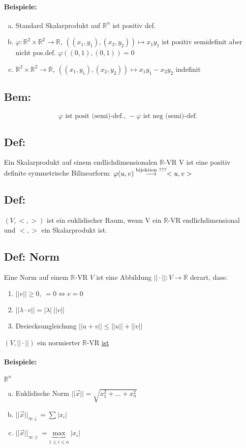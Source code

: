 \documentclass[titlepage,12pt,a4paper,ngerman]{report}
\newcommand{\tx}[1]{\textrm{#1}}
\begin{document}
\paragraph{Beispiele:} 
\begin{enumerate}[(a)]
	\item Standard Skalarprodukt auf $\mathbb R^n$ ist positiv def.
	\item $\varphi: \mathbb R^2 \times \mathbb R^2 \to \mathbb R,\ ((x_1,y_1),(x_2,y_2)) \mapsto x_1 y_1$ ist positiv semidefinit aber nicht pos.def. $\varphi ((0,1),(0,1)) = 0$
	\item $\mathbb R^2 \times \mathbb R^2 \to \mathbb R,\ ((x_1,y_1),(x_2,y_2)) \mapsto x_1y_1  - x_2y_2$ indefinit
\end{enumerate}
\subsection*{Bem:}  
$$\varphi \tx{ ist posit (semi)-def., } -\varphi \tx{ ist neg (semi)-def.}$$
\subsection{Def:}
Ein Skalarprodukt auf einem endlichdimensionalen $ \mathbb{R} $-VR V ist eine positiv definite symmetrische Bilinearform: $ \varphi(u,v) \buildrel \tx{bijektion ???} \over \longrightarrow <u,v> $
\subsection{Def:}
$ (V,<,>) $ ist ein euklidischer Raum, wenn V ein $ \mathbb{R} $-VR endlichdimensional  und $ <,> $ ein Skalarprodukt ist.
\subsection{Def: Norm}
Eine Norm auf einem $\mathbb R$-VR $V$ ist eine Abbildung $||\cdot||: V \to \mathbb R$ derart, dass:
\begin{enumerate}
	\item $||v|| \geq 0,\ = 0 \Leftrightarrow v = 0$
	\item $||\lambda \cdot v|| = |\lambda|\ ||v||$
	\item Dreiecksungleichung $||u + v|| \leq ||u|| + ||v||$
\end{enumerate}
$(V, || \cdot ||)$ ein normierter $\mathbb R$-VR \underline{ist}
\paragraph{Beispiele:} $\mathbb R^n$
\begin{enumerate}[(a)]
	\item Euklidische Norm $||\vec{x}|| = \sqrt{x_1^2+ \dots + x_n^2}$
	\item $||\vec{x}||_{\infty \downarrow} = \sum |x_i|$
	\item $||\vec{x}||_{\infty \geq} = \underbrace{\tx{max}}_{1 \leq i \leq n}\ |x_i|$
\end{enumerate}
\end{document}
